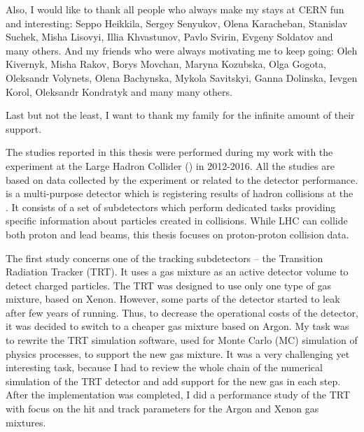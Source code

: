 \begin{acknowledgements}
Also, I would like to thank all people who always make my stays at CERN fun and interesting: Seppo Heikkila, Sergey Senyukov, Olena Karacheban, Stanislav Suchek, Misha Lisovyi, Illia Khvastunov, Pavlo Svirin, Evgeny Soldatov and many others.
And my friends who were always motivating me to keep going: Oleh Kivernyk, Misha Rakov, Borys Movchan, Maryna Kozubska, Olga Gogota, Oleksandr Volynets, Olena Bachynska, Mykola Savitskyi, Ganna Dolinska, Ievgen Korol, Oleksandr Kondratyk and many many others.

Last but not the least, I want to thank my family for the infinite amount of their support.

\end{acknowledgements}


\begin{preface}

The studies reported in this thesis were performed during my work with the \ATLAS experiment at the Large Hadron Collider (\LHC) in 2012-2016. All the studies are based on data collected by the \ATLAS experiment or related to the \ATLAS detector performance.
\ATLAS is a multi-purpose detector which is registering results of hadron collisions at the \LHC. It consists of a set of subdetectors which perform dedicated tasks providing specific information about particles created in collisions.
While LHC can collide both proton and lead beams, this thesis focuses on proton-proton collision data.

The first study concerns one of the \ATLAS tracking subdetectors -- the Transition Radiation Tracker (TRT).
It uses a gas mixture as an active detector volume to detect charged particles. The TRT was designed to use only one type of gas mixture, based on Xenon. However, some parts of the detector started to leak after few years of running. Thus, to decrease the operational costs of the detector, it was decided to switch to a cheaper gas mixture based on Argon. My task was to rewrite the TRT simulation software, used for Monte Carlo (MC) simulation of physics processes, to support the new gas mixture. It was a very challenging yet interesting task, because I had to review the whole chain of the numerical simulation of the TRT detector and add support for the new gas in each step. After the implementation was completed, I did a performance study of the TRT with focus on the hit and track parameters for the Argon and Xenon gas mixtures.


\end{preface}
